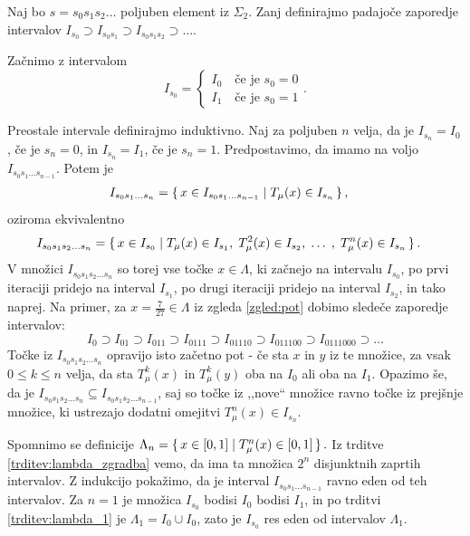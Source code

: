 \documentclass{isrmdelo}
\newcommand{\narekovaji}[1]{,,#1``}
\begin{document}
\begin{dokaz}
Naj bo $s = s_0 s_1 s_2 \dots$ poljuben element iz $\Sigma_2$. Zanj definirajmo padajoče zaporedje intervalov $I_{s_0} \supset I_{s_0 s_1} \supset I_{s_0 s_1 s_2} \supset \dots$.

Začnimo z intervalom
\begin{equation*}
I_{s_0} = 
\begin{cases}
I_0 \quad \text{če je } s_0 = 0 \\
I_1 \quad \text{če je } s_0 = 1
\end{cases}.
\end{equation*}

Preostale intervale definirajmo induktivno. Naj za poljuben $n$ velja, da je $I_{s_n} = I_0$, če je $s_n=0$, in $I_{s_n} = I_1$, če je $s_n=1$. Predpostavimo, da imamo na voljo $I_{s_0 s_1 \dots s_{n-1}}$. Potem je
\begin{align*}
&I_{s_0 s_1 \dots s_n} = \set{ x \in I_{s_0 s_1 \dots s_{n-1}} \mid T_\mu(x) \in I_{s_n} },
\end{align*}
oziroma ekvivalentno
\begin{align*}
&I_{s_0 s_1 s_2 \dots s_n} = \set{ x \in I_{s_0} \mid T_\mu(x) \in I_{s_1}, \; T_\mu^2(x) \in I_{s_2}, \; \dots \; , \; T_\mu^n(x) \in I_{s_n} }.
\end{align*}
V množici $I_{s_0 s_1 s_2 \dots s_n}$ so torej vse točke $x \in \Lambda$, ki začnejo na intervalu $I_{s_0}$, po prvi iteraciji pridejo na interval $I_{s_1}$, po drugi iteraciji pridejo na interval $I_{s_2}$, in tako naprej.
Na primer, za $x = \frac{7}{27} \in \Lambda$ iz zgleda \ref{zgled:pot} dobimo sledeče zaporedje intervalov:
\begin{equation*}
    I_0 \supset I_{01} \supset I_{011} \supset I_{0111} \supset I_{01110} \supset I_{011100} \supset I_{0111000} \supset \dots
\end{equation*}
Točke iz $I_{s_0 s_1 s_2 \dots s_n}$ opravijo isto začetno pot - če sta $x$ in $y$ iz te množice, za vsak $0 \leq k \leq n$ velja, da sta $T_\mu^k(x)$ in $T_\mu^k(y)$ oba na $I_0$ ali oba na $I_1$. Opazimo še, da je $I_{s_0 s_1 s_2 \dots s_n} \subseteq I_{s_0 s_1 s_2 \dots s_{n-1}}$, saj so točke iz \narekovaji{nove} množice ravno točke iz prejšnje množice, ki ustrezajo dodatni omejitvi $T_\mu^n(x) \in I_{s_n}$.

\bigskip

Spomnimo se definicije $\Lambda_{n} = \set{ x \in [0,1] \mid T_\mu^{n}(x) \in [0,1] }.$ Iz trditve \ref{trditev:lambda_zgradba} vemo, da ima ta množica $2^n$ disjunktnih zaprtih intervalov. Z indukcijo pokažimo, da je interval $I_{s_0 s_1 \dots s_{n-1}}$ ravno eden od teh intervalov. Za $n=1$ je množica $I_{s_0}$ bodisi $I_0$ bodisi $I_1$, in po trditvi \ref{trditev:lambda_1} je $\Lambda_1 = I_0 \cup I_0$, zato je $I_{s_0}$ res eden od intervalov $\Lambda_1$.


\end{dokaz}
\end{document}
